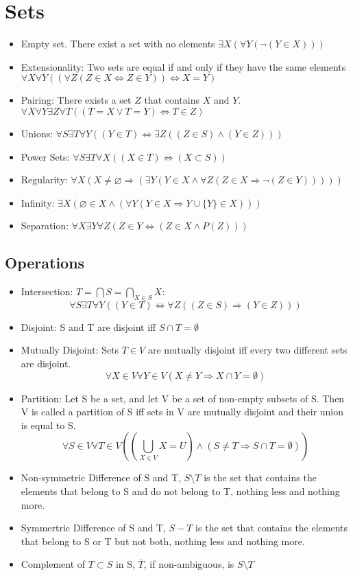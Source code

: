 \documentclass[11pt, twocolumn]{article}
\newenvironment{compactitem}
{\begin{itemize}
  \setlength{\itemsep}{1px}
  \setlength{\parskip}{0pt}
  \setlength{\parsep}{0pt}}
{\end{itemize}}
\begin{document}
\section{Sets}
\begin{compactitem}
\item Empty set. There exist a set with no elements $\exists X (\forall Y(\neg(Y\in X)))$
\item Extensionality: Two sets are equal if and only if they have the same elements $\forall X\forall Y ((\forall Z(Z \in X \Leftrightarrow Z\in Y)) \Leftrightarrow X=Y)$
\item Pairing: There exists a set $Z$ that contains $X$ and $Y$. $\forall X \forall Y \exists Z \forall T ((T=X\vee T=Y)\Leftrightarrow T\in Z)$
\item Unions: $\forall S \exists T \forall Y ((Y\in T)\Leftrightarrow \exists Z((Z\in S)\wedge (Y\in Z)))$
\item Power Sets: $\forall S \exists T \forall X (( X\in T) \Leftrightarrow (X\subset S))$
\item Regularity: $\forall X (X \neq \varnothing \Rightarrow (\exists Y (Y \in X \wedge \forall Z (Z\in X \Rightarrow \neg (Z\in Y)))))$
\item Infinity: $\exists X(\varnothing \in X \wedge (\forall Y (Y\in X \Rightarrow Y\cup \{ Y \} \in X )))$
\item Separation: $ \forall X \exists Y \forall Z (Z\in Y \Leftrightarrow (Z\in X \wedge P(Z)))$
\end{compactitem}
\subsection{Operations}
\begin{compactitem}
\item Intersection: $T=\bigcap S = \bigcap\limits_{X\in S}X$: 
$$\forall S\exists T\forall Y((Y\in T)\Leftrightarrow\forall Z((Z\in S)\Rightarrow(Y\in Z)))$$
\item Disjoint: S and T are disjoint iff $S\cap T=\emptyset$
\item Mutually Disjoint: Sets $T\in V$ are mutually disjoint iff every two different sets are disjoint.
$$\forall X\in V\forall Y\in V(X\neq Y\Rightarrow X\cap Y=\emptyset)$$
\item Partition: Let S be a set, and let V be a set of non-empty subsets of S. Then V is called a partition of S iff sets in V are mutually disjoint and their union is equal to S.
$$\forall S\in V\forall T\in V((\bigcup\limits_{X\in V}X=U)\land(S\neq T\Rightarrow S\cap T=\emptyset))$$
\item Non-symmetric Difference of S and T, $S\setminus T$ is the set that contains the elements that belong to S and do not belong to T, nothing less and nothing more.
\item Symmertric Difference of S and T, $S-T$ is the set that contains the elements that belong to S or T but not both, nothing less and nothing more.
\item Complement of $T\subset S$ in S, $\overline T$, if non-ambiguous, is $S\setminus T$
\end{compactitem}
\end{document}
